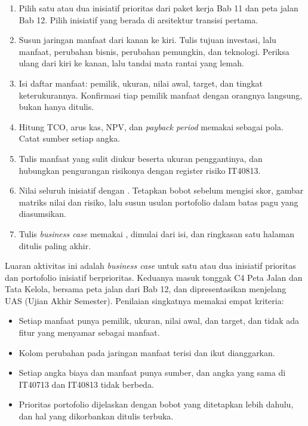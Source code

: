 \begin{enumerate}
  \item Pilih satu atau dua inisiatif prioritas dari paket kerja Bab 11 dan
        peta jalan Bab 12. Pilih inisiatif yang berada di arsitektur transisi
        pertama.
  \item Susun jaringan manfaat dari kanan ke kiri. Tulis tujuan investasi,
        lalu manfaat, perubahan bisnis, perubahan pemungkin, dan teknologi.
        Periksa ulang dari kiri ke kanan, lalu tandai mata rantai yang
        lemah.
  \item Isi daftar manfaat: pemilik, ukuran, nilai awal, target, dan tingkat
        keterukurannya. Konfirmasi tiap pemilik manfaat dengan orangnya
        langsung, bukan hanya ditulis.
  \item Hitung TCO, arus kas, NPV, dan \textit{payback period} memakai
         sebagai pola.
        Catat sumber setiap angka.
  \item Tulis manfaat yang sulit diukur beserta ukuran penggantinya, dan
        hubungkan pengurangan risikonya dengan register risiko IT40813.
  \item Nilai seluruh inisiatif dengan
        .
        Tetapkan bobot sebelum mengisi skor, gambar matriks nilai dan risiko,
        lalu susun usulan portofolio dalam batas pagu yang diasumsikan.
  \item Tulis \textit{business case} memakai
        , dimulai dari
        isi, dan ringkasan satu halaman ditulis paling akhir.
\end{enumerate}

Luaran aktivitas ini adalah \textit{business case} untuk satu atau dua
inisiatif prioritas dan portofolio inisiatif berprioritas. Keduanya masuk
tonggak C4 Peta Jalan dan Tata Kelola, bersama peta jalan dari Bab 12, dan
dipresentasikan menjelang UAS (Ujian Akhir Semester). Penilaian singkatnya
memakai empat kriteria:

\begin{itemize}
  \item Setiap manfaat punya pemilik, ukuran, nilai awal, dan target, dan
        tidak ada fitur yang menyamar sebagai manfaat.
  \item Kolom perubahan pada jaringan manfaat terisi dan ikut dianggarkan.
  \item Setiap angka biaya dan manfaat punya sumber, dan angka yang sama di
        IT40713 dan IT40813 tidak berbeda.
  \item Prioritas portofolio dijelaskan dengan bobot yang ditetapkan lebih
        dahulu, dan hal yang dikorbankan ditulis terbuka.
\end{itemize}

